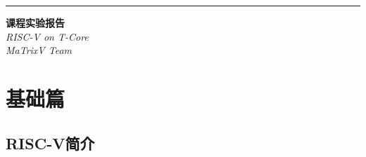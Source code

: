 \documentclass[a4paper, 14pt, oneside]{book} %
\numberwithin{equation}{subsection}
\begin{document}
	\newpage
	\begin{titlepage} %
		
		\raggedleft %
		\rule{1pt}{\textheight} %
		\hspace{0.05\textwidth} %
		\parbox[b]{0.75\textwidth}{ %
			
			{\Huge\bfseries  课程实验报告}\\[2\baselineskip] %
			{\LARGE\textit{RISC-V on T-Core}}\\[4\baselineskip] %
			{\Large\textit{MaTrixV Team}} %
			
			\vspace{0.5\textheight} %
		}
	\end{titlepage}

	\newpage
	\tableofcontents
	
	\newpage
	\section{基础篇}
		\subsection{RISC-V简介}
\end{document}
